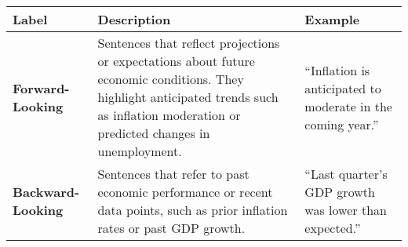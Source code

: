 \begin{table*}
    \caption{}
    \vspace{1em}
    \begin{tabular}{p{}p{}p{}}
    \toprule
    \textbf{Label} & \textbf{Description} & \textbf{Example} \\
    \midrule
    \textbf{Forward-Looking} & Sentences that reflect projections or expectations about future economic conditions. They highlight anticipated trends such as inflation moderation or predicted changes in unemployment. & ``Inflation is anticipated to moderate in the coming year.'' \\
    \midrule
    \textbf{Backward-Looking} & Sentences that refer to past economic performance or recent data points, such as prior inflation rates or past GDP growth. & ``Last quarter's GDP growth was lower than expected.'' \\
    \bottomrule
    \end{tabular}
    \label{tb:bot_forward_looking_guide}
    \end{table*}
    